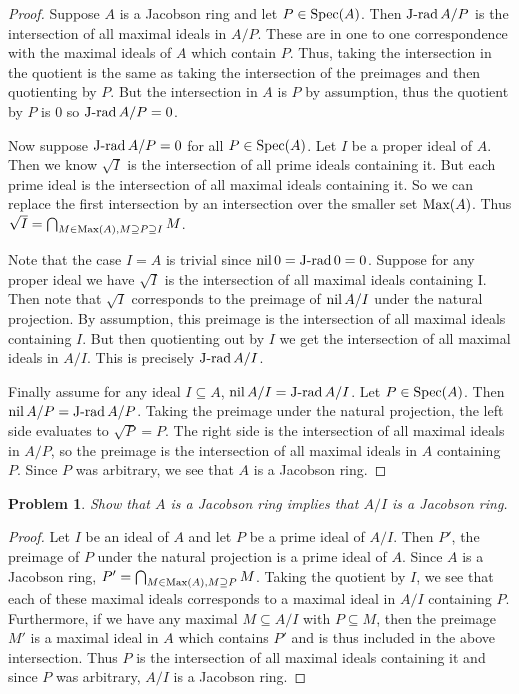 \documentclass{article}
\newcommand{\spec}{\textup{Spec}}
\newcommand{\J}{\textup{J-rad}\,}
\newcommand{\nil}{\textup{nil}\,}
\newcommand{\Max}{\textup{Max}}
\newtheorem{problem}{Problem}
\begin{document}
\begin{proof}
Suppose $A$ is a Jacobson ring and let $P \in \spec(A)$. Then $\J A/P$ is the intersection of all maximal ideals in $A/P$. These are in one to one correspondence with the maximal ideals of $A$ which contain $P$. Thus, taking the intersection in the quotient is the same as taking the intersection of the preimages and then quotienting by $P$. But the intersection in $A$ is $P$ by assumption, thus the quotient by $P$ is $0$ so $\J A/P = 0$.

Now suppose $\J A/P = 0$ for all $P \in \spec(A)$. Let $I$ be a proper ideal of $A$. Then we know $\sqrt{I}$ is the intersection of all prime ideals containing it. But each prime ideal is the intersection of all maximal ideals containing it. So we can replace the first intersection by an intersection over the smaller set $\Max(A)$. Thus $\sqrt{I} = \bigcap_{M \in \Max(A), M \supseteq P \supseteq I} M$.

Note that the case $I = A$ is trivial since $\nil 0 = \J 0 = 0$. Suppose for any proper ideal we have $\sqrt{I}$ is the intersection of all maximal ideals containing I. Then note that $\sqrt{I}$ corresponds to the preimage of $\nil A/I$ under the natural projection. By assumption, this preimage is the intersection of all maximal ideals containing $I$. But then quotienting out by $I$ we get the intersection of all maximal ideals in $A/I$. This is precisely $\J A/I$.

Finally assume for any ideal $I \subseteq A$, $\nil A/I = \J A/I$. Let $P \in \spec(A)$. Then $\nil A/P = \J A/P$. Taking the preimage under the natural projection, the left side evaluates to $\sqrt{P} = P$. The right side is the intersection of all maximal ideals in $A/P$, so the preimage is the intersection of all maximal ideals in $A$ containing $P$. Since $P$ was arbitrary, we see that $A$ is a Jacobson ring.
\end{proof}

\begin{problem}
Show that $A$ is a Jacobson ring implies that $A/I$ is a Jacobson ring.
\end{problem}
\begin{proof}
Let $I$ be an ideal of $A$ and let $P$ be a prime ideal of $A/I$. Then $P'$, the preimage of $P$ under the natural projection is a prime ideal of $A$. Since $A$ is a Jacobson ring, $P' = \bigcap_{M \in \Max(A), M \supseteq P} M$. Taking the quotient by $I$, we see that each of these maximal ideals corresponds to a maximal ideal in $A/I$ containing $P$. Furthermore, if we have any maximal $M \subseteq A/I$ with $P \subseteq M$, then the preimage $M'$ is a maximal ideal in $A$ which contains $P'$ and is thus included in the above intersection. Thus $P$ is the intersection of all maximal ideals containing it and since $P$ was arbitrary, $A/I$ is a Jacobson ring.
\end{proof}
\end{document}
